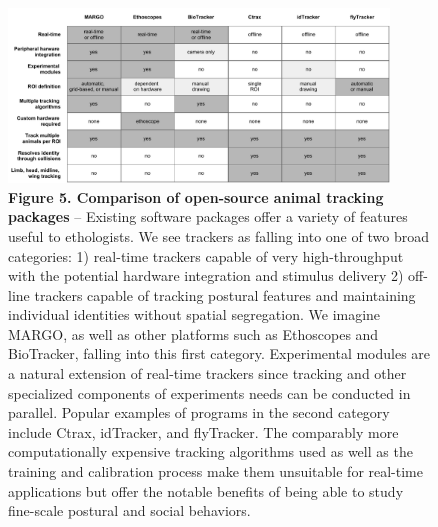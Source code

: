 \documentclass[10pt]{article}
\begin{document}
\newpage
\begin{figure}[t!]
	\begin{center}
		\vspace*{-8cm}
		\includegraphics[width=0.9\textwidth]{../figures/platform_comparison_table.pdf}
	\end{center}
	\caption*{\footnotesize \textbf{Figure 5. Comparison of open-source animal tracking packages} -- Existing software packages offer a variety of features useful to ethologists. We see trackers as falling into one of two broad categories: 1) real-time trackers capable of very high-throughput with the potential hardware integration and stimulus delivery 2) off-line trackers capable of tracking postural features and maintaining individual identities without spatial segregation. We imagine MARGO, as well as other platforms such as Ethoscopes and BioTracker, falling into this first category. Experimental modules are a natural extension of real-time trackers since tracking and other specialized components of experiments needs can be conducted in parallel. Popular examples of programs in the second category include Ctrax, idTracker, and flyTracker. The comparably more computationally expensive tracking algorithms used as well as the training and calibration process make them unsuitable for real-time applications but offer the notable benefits of being able to study fine-scale postural and social behaviors.}
\end{figure}
\end{document}
